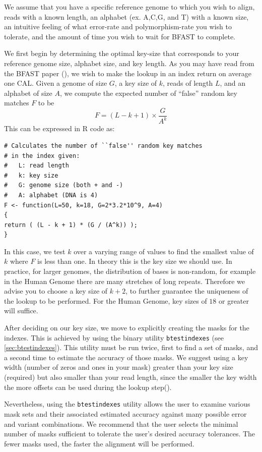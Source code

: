 \documentclass[a4paper,12pt]{book}
\newcommand{\TT}[1]{{\tt #1}} %
\begin{document}
We assume that you have a specific reference genome to which you wish to align, reads with a known length, an alphabet (ex. A,C,G, and T) with a known size, an intuitive feeling of what error-rate and polymorphism-rate you wish to tolerate, and the amount of time you wish to wait for BFAST to complete.

We first begin by determining the optimal key-size that corresponds to your reference genome size, alphabet size, and key length.
As you may have read from the BFAST paper (\cite{BFAST}), we wish to make the lookup in an index return on average one CAL.
Given a genome of size $G$, a key size of $k$, reads of length $L$, and an alphabet of size $A$, we compute the expected number of ``false'' random key matches $F$ to be
\[F=(L-k+1)\times \frac{G}{A^k}\]
This can be expressed in R code as:
\begin{verbatim}
# Calculates the number of ``false'' random key matches
# in the index given:
#   L: read length
#   k: key size
#   G: genome size (both + and -)
#   A: alphabet (DNA is 4)
F <- function(L=50, k=18, G=2*3.2*10^9, A=4)
{
return ( (L - k + 1) * (G / (A^k)) );
}
\end{verbatim}
In this case, we test $k$ over a varying range of values to find the smallest value of $k$ where $F$ is less than one.
In theory this is the key size we should use.
In practice, for larger genomes, the distribution of bases is non-random, for example in the Human Genome there are many stretches of long repeats.
Therefore we advise you to choose a key size of $k+2$, to further guarantee the uniqueness of the lookup to be performed.
For the Human Genome, key sizes of $18$ or greater will suffice.

After deciding on our key size, we move to explicitly creating the masks for the indexes.
This is achieved by using the binary utility \TT{btestindexes} (see \autoref{sec:btestindexes}).
This utility must be run twice, first to find a set of masks, and a second time to estimate the accuracy of those masks.
We suggest using a key width (number of zeros and ones in your mask) greater than your key size (required) but also smaller than your read length, since the smaller the key width the more offsets can be used during the lookup step(\cite{BFAST}).

Nevertheless, using the \TT{btestindexes} utility allows the user to examine various mask sets and their associated estimated accuracy against many possible error and variant combinations.
We recommend that the user selects the minimal number of masks sufficient to tolerate the user's desired accuracy tolerances.
The fewer masks used, the faster the alignment will be performed.
\end{document}
